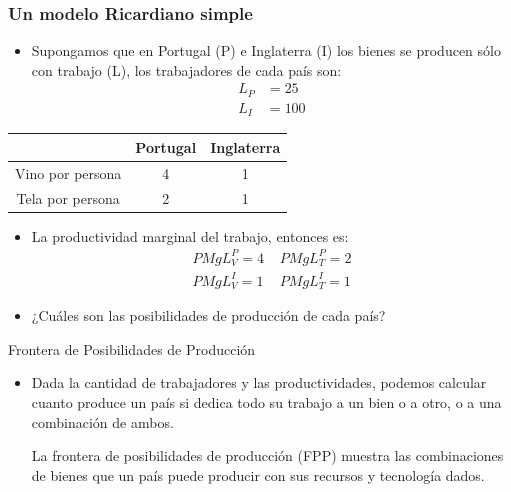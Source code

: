 \documentclass{beamer}
\begin{document}
\begin{frame}
    \frametitle{Un modelo Ricardiano simple}
    \begin{itemize}
        \item Supongamos que en Portugal (P) e Inglaterra (I) los bienes se producen sólo con trabajo (L), los trabajadores de cada país son:
        \begin{equation*}
            \begin{aligned}
                L_P & = 25 \\
                L_I & = 100
            \end{aligned}
        \end{equation*}
    \end{itemize} 
    \begin{center}
        \begin{tabular}{|c|c|c|} \hline
            & Portugal & Inglaterra \\ \hline
            Vino por persona   & 4 & 1 \\ \hline
            Tela por persona   & 2 & 1 \\ \hline     
        \end{tabular}
    \end{center}
    \begin{itemize}
        \item La productividad marginal del trabajo, entonces es:
            \begin{equation*}
                \begin{aligned}
                    PMgL_V^{P} = 4 \, &\, PMgL_T^{P} = 2 \\
                    PMgL_V^{I} = 1 \, &\, PMgL_T^{I} = 1
                \end{aligned}
            \end{equation*}
        \item ¿Cuáles son las posibilidades de producción de cada país?    
    \end{itemize} 
\end{frame}

\begin{frame}{Frontera de Posibilidades de Producción}
    \begin{itemize}
        \item Dada la cantidad de trabajadores y las productividades, podemos calcular cuanto produce un país si dedica todo su trabajo a un bien o a otro, o a una combinación de ambos.
        \begin{boxA}
            \centering
            La frontera de posibilidades de producción (FPP) muestra las combinaciones de bienes que un país puede producir con sus recursos y tecnología dados.
        \end{boxA}
    \end{itemize}

\end{frame}
\end{document}
